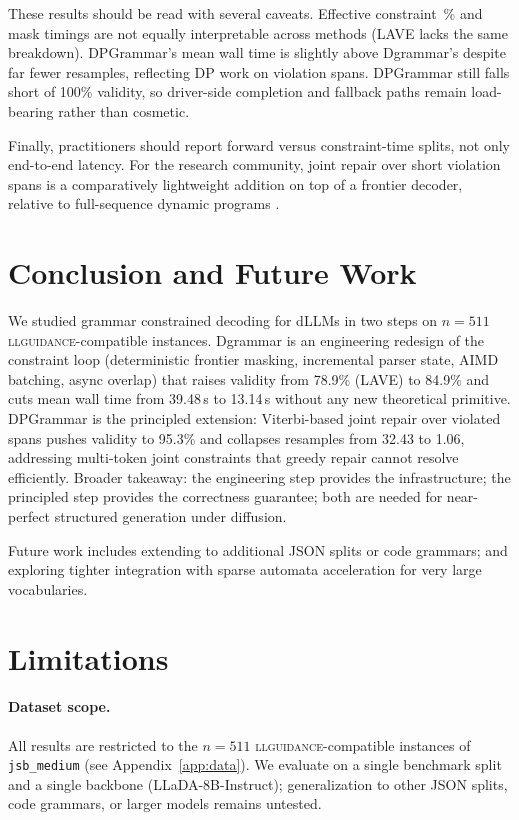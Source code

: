 These results should be read with several caveats. Effective constraint~\% and mask timings are not equally interpretable across methods (LAVE lacks the same breakdown). DPGrammar's mean wall time is slightly above Dgrammar's despite far fewer resamples, reflecting DP work on violation spans. DPGrammar still falls short of 100\% validity, so driver-side completion and fallback paths remain load-bearing rather than cosmetic.

Finally, practitioners should report forward versus constraint-time splits, not only end-to-end latency. For the research community, joint repair over short violation spans is a comparatively lightweight addition on top of a frontier decoder, relative to full-sequence dynamic programs \citep{suresh2025dingoconstrainedinferencediffusion}.


\section{Conclusion and Future Work}

We studied grammar constrained decoding for dLLMs in two steps on $n{=}511$ \textsc{llguidance}-compatible instances. Dgrammar is an engineering redesign of the constraint loop (deterministic frontier masking, incremental parser state, AIMD batching, async overlap) that raises validity from 78.9\% (LAVE) to 84.9\% and cuts mean wall time from 39.48\,s to 13.14\,s without any new theoretical primitive. DPGrammar is the principled extension: Viterbi-based joint repair over violated spans pushes validity to 95.3\% and collapses resamples from 32.43 to 1.06, addressing multi-token joint constraints that greedy repair cannot resolve efficiently. Broader takeaway: the engineering step provides the infrastructure; the principled step provides the correctness guarantee; both are needed for near-perfect structured generation under diffusion.

Future work includes extending to additional JSON splits or code grammars; and exploring tighter integration with sparse automata acceleration \citep{su2026vectorizingtrieefficientconstrained} for very large vocabularies.

\section{Limitations}

\paragraph{Dataset scope.}
All results are restricted to the $n{=}511$ \textsc{llguidance}-compatible instances of \texttt{jsb\_medium} (see Appendix~\ref{app:data}).
We evaluate on a single benchmark split and a single backbone (LLaDA-8B-Instruct); generalization to other JSON splits, code grammars, or larger models remains untested.

